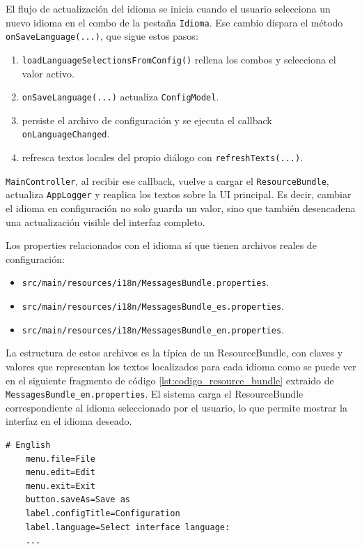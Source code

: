 \documentclass[../../main.tex]{subfiles}
\begin{document}
El flujo de actualización del idioma se inicia cuando el usuario selecciona un nuevo idioma en el combo de la pestaña \lstinline|Idioma|. Ese cambio dispara el método \lstinline|onSaveLanguage(...)|, que sigue estos pasos:

\begin{enumerate}
    \item \lstinline|loadLanguageSelectionsFromConfig()| rellena los combos y selecciona el valor activo.
    \item \lstinline|onSaveLanguage(...)| actualiza \lstinline|ConfigModel|.
    \item persiste el archivo de configuración y se ejecuta el callback \lstinline|onLanguageChanged|.
    \item refresca textos locales del propio diálogo con \lstinline|refreshTexts(...)|.
\end{enumerate}

\lstinline|MainController|, al recibir ese callback, vuelve a cargar el \lstinline|ResourceBundle|, actualiza \lstinline|AppLogger| y reaplica los textos sobre la UI principal. Es decir, cambiar el idioma en configuración no solo guarda un valor, sino que también desencadena una actualización visible del interfaz completo.

Los properties relacionados con el idioma sí que tienen archivos reales de configuración:

\begin{itemize}
    \item \lstinline|src/main/resources/i18n/MessagesBundle.properties|.
    \item \lstinline|src/main/resources/i18n/MessagesBundle_es.properties|.
    \item \lstinline|src/main/resources/i18n/MessagesBundle_en.properties|.
\end{itemize}

La estructura de estos archivos es la típica de un ResourceBundle, con claves y valores que representan los textos localizados para cada idioma como se puede ver en el siguiente fragmento de código \ref{lst:codigo_resource_bundle} extraido de \lstinline|MessagesBundle_en.properties|. El sistema carga el ResourceBundle correspondiente al idioma seleccionado por el usuario, lo que permite mostrar la interfaz en el idioma deseado.

\begin{lstlisting}[style=mystyle, caption={Ejemplo de contenido del ResourceBundle en inglés}, label={lst:codigo_resource_bundle}]
    # English
    menu.file=File
    menu.edit=Edit
    menu.exit=Exit
    button.saveAs=Save as
    label.configTitle=Configuration
    label.language=Select interface language:
    ...
\end{lstlisting}
\end{document}
